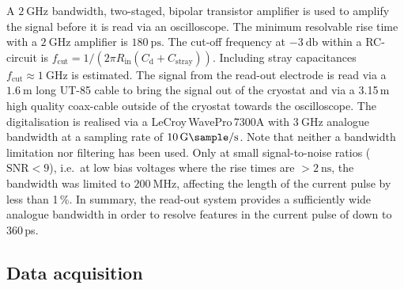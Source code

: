 A $\SI{2}{\giga\hertz}$ bandwidth, two-staged, bipolar transistor amplifier %
 is used to amplify the signal before it is read via an oscilloscope. 
The minimum resolvable rise time with a $\SI{2}{\giga\hertz}$ amplifier is $\SI{180}{\pico\second}$. 
The cut-off frequency at $\SI{-3}{\decibel}$ within a RC-circuit is $f_{\textrm{cut}} = 1/(2\pi R_{\textrm{in}} \left( C_{\textrm{d}}+C_{\textrm{stray}}\right))$. 
Including stray capacitances $f_{\textrm{cut}}\approx \SI{1}{\giga\hertz}$ is estimated. 
The signal from the read-out electrode is read via a $\SI{1.6}{\meter}$ long UT-85 cable to bring the signal out of the cryostat and via a 3.15\,m high quality coax-cable outside of the cryostat
 towards the oscilloscope.
The digitalisation is realised via a LeCroy\,WavePro\,7300A with $\SI{3}{\giga\hertz}$ analogue bandwidth at a sampling rate of $\SI{10}{\giga\sample/\second}$. 
Note that neither a bandwidth limitation nor filtering has been used. 
Only at small signal-to-noise ratios ($\textrm{SNR}<9$), i.e.~at low bias voltages where the rise times are $> \SI{2}{\nano\second}$, the bandwidth was limited to $\SI{200}{\mega\hertz}$,
 affecting the length of the current pulse by less than 1\,\%. 
In summary, the read-out system provides a sufficiently wide analogue bandwidth in order to resolve features in the current pulse of down to 360\,ps. 






\subsection{Data acquisition}

